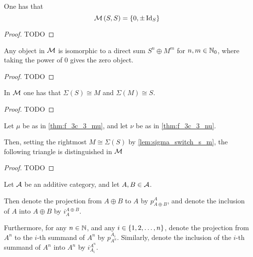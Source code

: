 \begin{lemma} \label{lem:S-to-S}
    One has that
    \[
        {\mathcal{M}}\left( S, S \right) = \left\{ 0, \pm \operatorname{Id}_S \right\}
    \]
\end{lemma}
\begin{proof}
    TODO
\end{proof}

\begin{lemma} \label{thm:f_3c_3_decomposition}
    Any object in \( {\mathcal{M}} \) is isomorphic to a direct sum \( S^n \oplus M^m \) for \( n, m \in {\mathbb{N}}_0 \), where taking the power of \( 0 \) gives the zero object.
\end{lemma}
\begin{proof}
    TODO
\end{proof}

\begin{lemma} \label{lem:sigma_switch_s_m}
    In \( {\mathcal{M}} \) one has that \( \Sigma(S) \cong M \) and \( \Sigma(M) \cong S \).
\end{lemma}
\begin{proof}
    TODO
\end{proof}

\begin{lemma} \label{lem:s_m_s_distinguished}
    Let \( \mu \) be as in \autoref{thm:f_3c_3_mu}, and let \( \nu \) be as in \autoref{thm:f_3c_3_nu}.

    Then, setting the rightmost \( M \cong \Sigma(S) \) by \autoref{lem:sigma_switch_s_m}, the following triangle is distinguished in \( {\mathcal{M}} \)
    \begin{center}
    \end{center}
\end{lemma}
\begin{proof}
    TODO
\end{proof}

\begin{notation}
    Let \( {\mathcal{A}} \) be an additive category, and let \( A, B \in {\mathcal{A}} \).

    Then denote the projection from \( A \oplus B \) to \( A \) by \( p_{A \oplus B}^A \), and denote the inclusion of \( A \) into \( A \oplus B \) by \( i_A^{A \oplus B} \).

    Furthermore, for any \( n \in {\mathbb{N}} \), and any \( i \in \left\{ 1, 2, \dots, n \right\} \), denote the projection from \( A^n \) to the \( i \)-th summand of \( A^n \) by \( p_{A^n}^{A_i} \). Similarly, denote the inclusion of the \( i \)-th summand of \( A^n \) into \( A^n \) by \( i_{A_i}^{A^n} \).
\end{notation}

